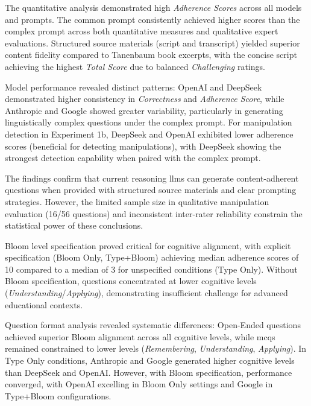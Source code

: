 The quantitative analysis demonstrated high \textit{Adherence Scores} across all models and prompts. The common prompt consistently achieved higher scores than the complex prompt across both quantitative measures and qualitative expert evaluations. Structured source materials (script and transcript) yielded superior content fidelity compared to Tanenbaum book excerpts, with the concise script achieving the highest \textit{Total Score} due to balanced \textit{Challenging} ratings.

Model performance revealed distinct patterns: OpenAI and DeepSeek demonstrated higher consistency in \textit{Correctness} and \textit{Adherence Score}, while Anthropic and Google showed greater variability, particularly in generating linguistically complex questions under the complex prompt. For manipulation detection in Experiment 1b, DeepSeek and OpenAI exhibited lower adherence scores (beneficial for detecting manipulations), with DeepSeek showing the strongest detection capability when paired with the complex prompt.

The findings confirm that current reasoning \acp{llm} can generate content-adherent questions when provided with structured source materials and clear prompting strategies. However, the limited sample size in qualitative manipulation evaluation (16/56 questions) and inconsistent inter-rater reliability constrain the statistical power of these conclusions.


Bloom level specification proved critical for cognitive alignment, with explicit specification (Bloom Only, Type+Bloom) achieving median adherence scores of 10 compared to a median of 3 for unspecified conditions (Type Only). Without Bloom specification, questions concentrated at lower cognitive levels (\textit{Understanding}/\textit{Applying}), demonstrating insufficient challenge for advanced educational contexts.

Question format analysis revealed systematic differences: Open-Ended questions achieved superior Bloom alignment across all cognitive levels, while \acp{mcq} remained constrained to lower levels (\textit{Remembering}, \textit{Understanding}, \textit{Applying}). In Type Only conditions, Anthropic and Google generated higher cognitive levels than DeepSeek and OpenAI. However, with Bloom specification, performance converged, with OpenAI excelling in Bloom Only settings and Google in Type+Bloom configurations.

